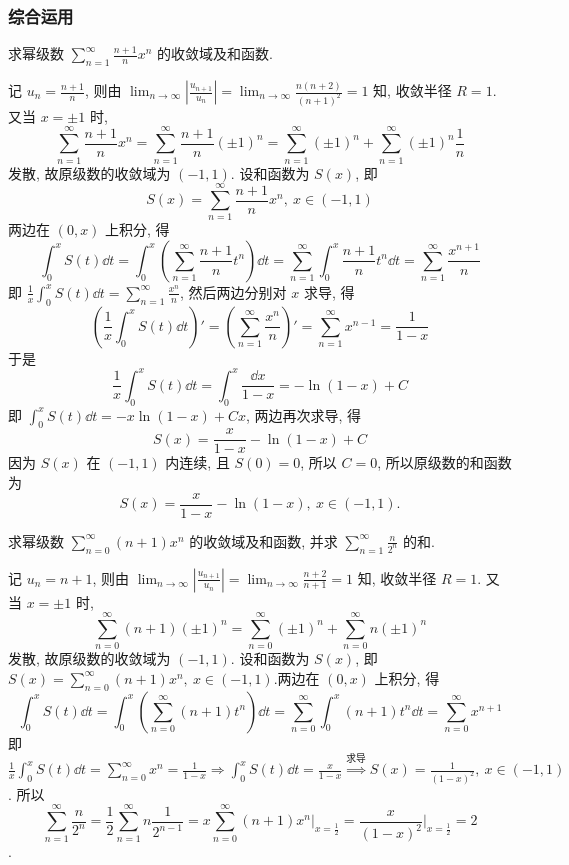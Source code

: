 \subsubsection{综合运用}

\begin{example}
    求幂级数 $\displaystyle\sum_{n=1}^\infty\frac{n+1}{n}x^n$ 的收敛域及和函数.
\end{example}
\begin{solution}
    记 $\displaystyle u_n=\frac{n+1}{n}$, 则由 $\displaystyle\lim_{n\to\infty}\left|\frac{u_{n+1}}{u_n}\right|=\lim_{n\to\infty}\frac{n(n+2)}{(n+1)^2}=1$ 知, 收敛半径 $R=1$.
    又当 $x=\pm 1$ 时, 
    $$\displaystyle\sum_{n=1}^\infty\frac{n+1}{n}x^n=\sum_{n=1}^\infty\frac{n+1}{n}(\pm 1)^n=\sum_{n=1}^\infty(\pm 1)^n+\sum_{n=1}^\infty(\pm 1)^n\frac{1}{n}$$
    发散, 故原级数的收敛域为 $(-1,1)$.
    设和函数为 $S(x)$, 即 $$\displaystyle S(x)=\sum_{n=1}^\infty\frac{n+1}{n}x^n,~x\in(-1,1)$$
    两边在 $(0,x)$ 上积分, 得
    $$\int_0^xS(t)\dd t=\int_0^x\left(\sum_{n=1}^\infty\frac{n+1}{n}t^n\right)\dd t=\sum_{n=1}^\infty\int_0^x\frac{n+1}{n}t^n\dd t=\sum_{n=1}^\infty\frac{x^{n+1}}{n}$$
    即 $\displaystyle\frac{1}{x}\int_0^xS(t)\dd t=\sum_{n=1}^\infty\frac{x^n}{n}$, 然后两边分别对 $x$ 求导, 得
    $$\left(\frac{1}{x}\int_0^xS(t)\dd t\right)'=\left(\sum_{n=1}^\infty\frac{x^n}{n}\right)'=\sum_{n=1}^\infty x^{n-1}=\frac{1}{1-x}$$
    于是$$\frac{1}{x}\int_0^xS(t)\dd t=\int_0^x\frac{\dd x}{1-x}=-\ln(1-x)+C$$
    即 $\displaystyle\int_0^xS(t)\dd t=-x\ln(1-x)+Cx$, 两边再次求导, 得
    $$S(x)=\frac{x}{1-x}-\ln(1-x)+C$$
    因为 $S(x)$ 在 $(-1,1)$ 内连续, 且 $S(0)=0$, 所以 $C=0$, 所以原级数的和函数为
    $$S(x)=\frac{x}{1-x}-\ln(1-x),~x\in(-1,1).$$
\end{solution}

\begin{example}
    求幂级数 $\displaystyle\sum_{n=0}^\infty(n+1)x^n$ 的收敛域及和函数, 并求 $\displaystyle\sum_{n=1}^\infty\frac{n}{2^n}$ 的和.
\end{example}
\begin{solution}
    记 $u_n=n+1$, 则由 $\displaystyle\lim_{n\to\infty}\left|\frac{u_{n+1}}{u_n}\right|=\lim_{n\to\infty}\frac{n+2}{n+1}=1$ 知, 收敛半径 $R=1$.
    又当 $x=\pm 1$ 时, $$\displaystyle\sum_{n=0}^\infty(n+1)(\pm 1)^n=\sum_{n=0}^\infty(\pm 1)^n+\sum_{n=0}^\infty n(\pm 1)^n$$
    发散, 故原级数的收敛域为 $(-1,1)$. 设和函数为 $S(x)$, 即 $\displaystyle S(x)=\sum_{n=0}^\infty(n+1)x^n,~x\in(-1,1)$.两边在 $(0,x)$ 上积分, 得
    $$\int_0^xS(t)\dd t=\int_0^x\left(\sum_{n=0}^\infty(n+1)t^n\right)\dd t=\sum_{n=0}^\infty\int_0^x(n+1)t^n\dd t=\sum_{n=0}^\infty x^{n+1}$$
    即 $\displaystyle\frac{1}{x}\int_0^xS(t)\dd t=\sum_{n=0}^\infty x^n=\frac{1}{1-x}\Rightarrow \int_0^xS(t)\dd t=\frac{x}{1-x}\overset{\text{求导}}{\Rightarrow}S(x)=\frac{1}{(1-x)^2},~x\in(-1,1)$.
    所以 $$\displaystyle\sum_{n=1}^\infty\frac{n}{2^n}=\frac{1}{2}\sum_{n=1}^\infty n \frac{1}{2^{n-1}}=x\sum_{n=0}^\infty(n+1)x^n\Biggl |_{x=\frac{1}{2}}=\frac{x}{(1-x)^2}\Biggl |_{x=\frac{1}{2}}=2$$.
\end{solution}

